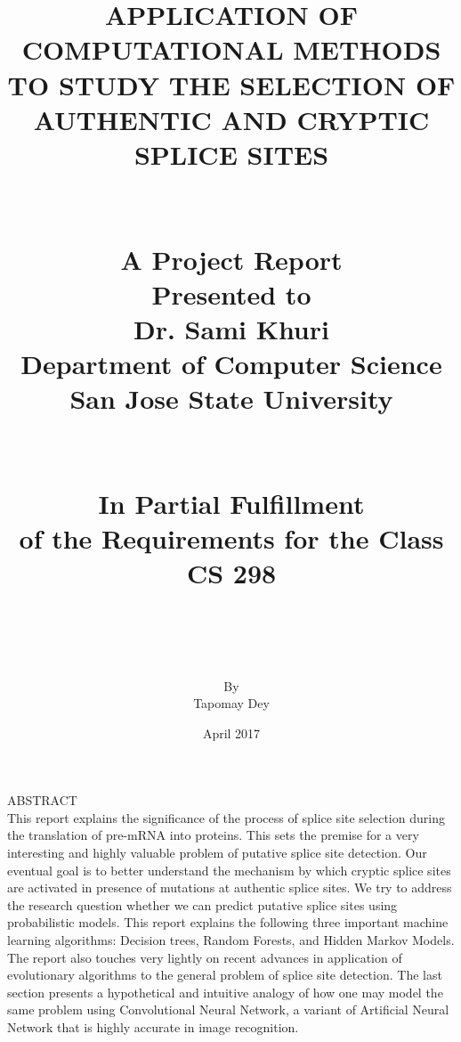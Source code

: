 \documentclass[12pt,a4paper]{article}
\begin{document}
	
	
	\title{
	    {APPLICATION OF COMPUTATIONAL METHODS TO STUDY THE SELECTION OF AUTHENTIC AND CRYPTIC SPLICE SITES}\\~\\~\\
	    {\large A Project Report}\\
	    {\large Presented to}\\
	    {\large Dr. Sami Khuri}\\
	    {\large Department of Computer Science}\\
	    {\large San Jose State University}\\~\\~\\
	    {\large In Partial Fulfillment}\\
	    {\large of the Requirements for the Class}\\
	    {\large CS 298}\\~\\~\\
    }
    
    \author{By\\Tapomay Dey}
    \date{April 2017}
	\maketitle
	
	\thispagestyle{empty}
	
	\newpage
	\doublespacing
	\noindent
	\large ABSTRACT\\
	This report explains the significance of the process of splice site selection during the translation of pre-mRNA into proteins. This sets the premise for a very interesting and highly valuable problem of putative splice site detection. Our eventual goal is to better understand the mechanism by which cryptic splice sites are activated in presence of mutations at authentic splice sites. We try to address the research question whether we can predict putative splice sites using probabilistic models. This report explains the following three important machine learning algorithms: Decision trees, Random Forests, and Hidden Markov Models. The report also touches very lightly on recent advances in application of evolutionary algorithms to the general problem of splice site detection. The last section presents a hypothetical and intuitive analogy of how one may model the same problem using Convolutional Neural Network, a variant of Artificial Neural Network that is highly accurate in image recognition.
    
\end{document}
